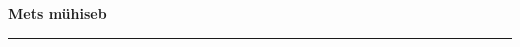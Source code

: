 \documentclass[10pt]{book}
\begin{document}
{
  \samepage
  \raggedbottom
  \raggedright
  \sloppy


  \vspace{0.2in}

  \noindent\begin{minipage}{.1\textwidth}
    \hfill\vspace{0.1in}
  \end{minipage}%
  \noindent\begin{minipage}{.8\textwidth}
    \centering
    \bfseries
    \large Mets m\"uhiseb
  \end{minipage}%
  \noindent\begin{minipage}{.1\textwidth}
      \hfill\vspace{0.1in}
  \end{minipage}

  \nopagebreak[4]
  \vspace{0.1in}
  \nopagebreak[4]
  \hrule height 0.05ex
  \nopagebreak[4]
  \vspace{-0.05in}




}
\end{document}
